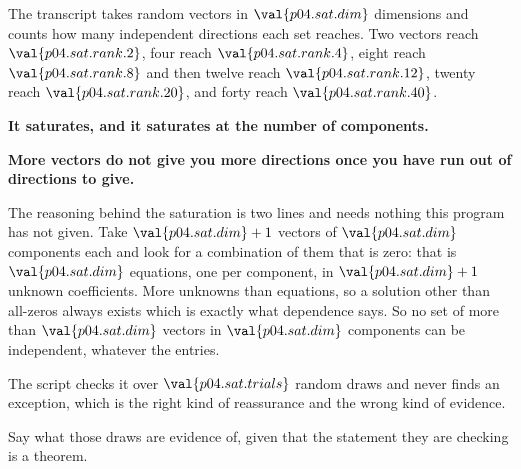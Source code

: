 \begin{fr}

The transcript takes random vectors in $\val{p04.sat.dim}$ dimensions and
counts how many independent directions each set reaches. Two vectors reach
$\val{p04.sat.rank.2}$, four reach $\val{p04.sat.rank.4}$, eight reach
$\val{p04.sat.rank.8}$ \dash{} and then twelve reach
$\val{p04.sat.rank.12}$, twenty reach $\val{p04.sat.rank.20}$, and forty reach
$\val{p04.sat.rank.40}$.

\textbf{It saturates, and it saturates at the number of components.}
\end{fr}


\begin{fr}
\begin{trapbox}
\textbf{More vectors do not give you more directions once you have run out of
directions to give.}

The reasoning behind the saturation is two lines and needs nothing this
program has not given. Take $\val{p04.sat.dim} + 1$ vectors of
$\val{p04.sat.dim}$ components each and look for a combination of them that is
zero: that is $\val{p04.sat.dim}$ equations, one per component, in
$\val{p04.sat.dim} + 1$ unknown coefficients. More unknowns than equations, so
a solution other than all-zeros always exists \dash{} which is exactly what
dependence says. So no set of more than $\val{p04.sat.dim}$ vectors in
$\val{p04.sat.dim}$ components can be independent, whatever the entries.

The script checks it over $\val{p04.sat.trials}$ random draws and never finds an
exception, which is the right kind of reassurance and the wrong kind of
evidence.
\end{trapbox}

Say what those draws are evidence of, given that the statement they are
checking is a theorem.
\dotline
\nextframe
\end{fr}

